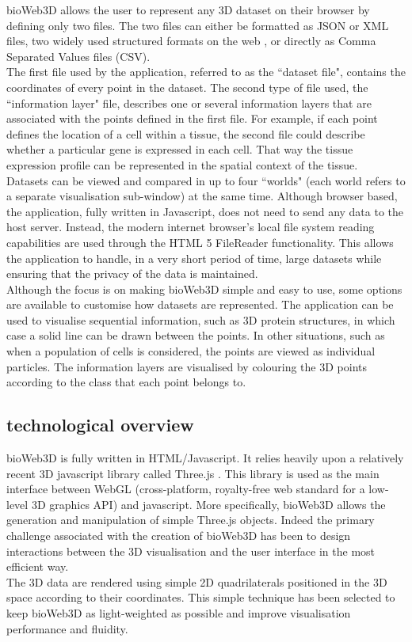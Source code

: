 \documentclass[10pt]{bmc_article}
\newenvironment{bmcformat}{\baselineskip20pt\sloppy\setboolean{publ}{false}}{\baselineskip20pt\sloppy}
\begin{document}
\begin{bmcformat}
bioWeb3D allows the user to represent any 3D dataset on their browser by defining only two files. The two files can either be formatted as JSON or XML files, two widely used structured formats on the web \cite{Wilde07} \cite{xml}, or directly as Comma Separated Values files (CSV).\\
The first file used by the application, referred to as the ``dataset file", contains the coordinates of every point in the dataset. The second type of file used, the ``information layer" file, describes one or several information layers that are associated with the points defined in the first file. For example, if each point defines the location of a cell within a tissue, the second file could describe whether a particular gene is expressed in each cell. That way the tissue expression profile can be represented in the spatial context of the tissue.\\
Datasets can be viewed and compared in up to four ``worlds" (each world refers to a separate visualisation sub-window) at the same time. Although browser based, the application, fully written in Javascript, does not need to send any data to the host server. Instead, the modern internet browser's local file system reading capabilities are used through the HTML 5 FileReader functionality. This allows the application to handle, in a very short period of time, large datasets while ensuring that the privacy of the data is maintained.\\
Although the focus is on making bioWeb3D simple and easy to use, some options are available to customise how datasets are represented. The application can be used to visualise sequential information, such as 3D protein structures, in which case a solid line can be drawn between the points. In other situations, such as when a population of cells is considered, the points are viewed as individual particles. The information layers are visualised by colouring the 3D points according to the class that each point belongs to.
\subsection{technological overview}
bioWeb3D is fully written in HTML/Javascript. It relies heavily upon a relatively recent 3D javascript library called Three.js \cite{three}. This library is used as the main interface between WebGL (cross-platform, royalty-free web standard for a low-level 3D graphics API) \cite{webgl} and javascript. More specifically, bioWeb3D allows the generation and manipulation of simple Three.js objects. Indeed the primary challenge associated with the creation of bioWeb3D has been to design interactions between the 3D visualisation and the user interface in the most efficient way.\\
The 3D data are rendered using simple 2D quadrilaterals positioned in the 3D space according to their coordinates. This simple technique has been selected to keep bioWeb3D as light-weighted as possible and improve visualisation performance and fluidity.

\end{bmcformat}
\end{document}
